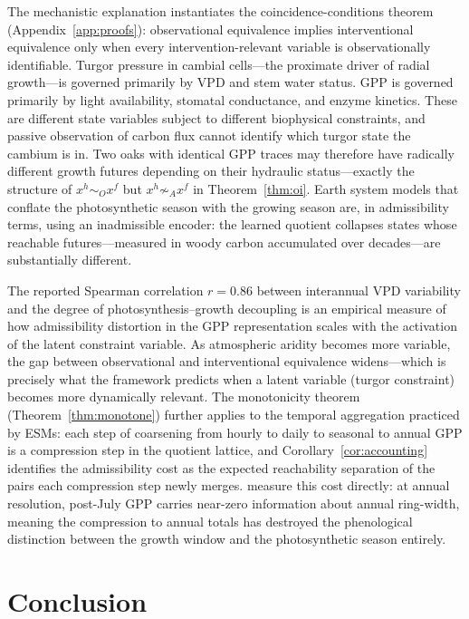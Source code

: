 \documentclass[10pt,twocolumn]{article}
\theoremstyle{plain}
\theoremstyle{definition}
\theoremstyle{remark}
\newcommand{\simA}{\sim_{\!A}}
\newcommand{\simO}{\sim_{\!O}}
\begin{document}
The mechanistic explanation instantiates the coincidence-conditions theorem
(Appendix~\ref{app:proofs}): observational equivalence implies interventional
equivalence only when every intervention-relevant variable is observationally
identifiable. Turgor pressure in cambial cells---the proximate driver of
radial growth---is governed primarily by VPD and stem water status. GPP is
governed primarily by light availability, stomatal conductance, and enzyme
kinetics. These are different state variables subject to different biophysical
constraints, and passive observation of carbon flux cannot identify which
turgor state the cambium is in. Two oaks with identical GPP traces may
therefore have radically different growth futures depending on their hydraulic
status---exactly the structure of $x^h \simO x^f$ but $x^h \not\simA x^f$
in Theorem~\ref{thm:oi}. Earth system models that conflate the photosynthetic
season with the growing season are, in admissibility terms, using an
inadmissible encoder: the learned quotient collapses states whose reachable
futures---measured in woody carbon accumulated over decades---are substantially
different.

The reported Spearman correlation $r = 0.86$ between interannual VPD
variability and the degree of photosynthesis--growth decoupling
\citep{rao2026decoupled} is an empirical measure of how admissibility
distortion in the GPP representation scales with the activation of the
latent constraint variable. As atmospheric aridity becomes more variable,
the gap between observational and interventional equivalence widens---which
is precisely what the framework predicts when a latent variable (turgor
constraint) becomes more dynamically relevant. The monotonicity theorem
(Theorem~\ref{thm:monotone}) further applies to the temporal aggregation
practiced by ESMs: each step of coarsening from hourly to daily to seasonal
to annual GPP is a compression step in the quotient lattice, and
Corollary~\ref{cor:accounting} identifies the admissibility cost as the
expected reachability separation of the pairs each compression step newly
merges. \citeauthor{rao2026decoupled} measure this cost directly: at annual
resolution, post-July GPP carries near-zero information about annual
ring-width, meaning the compression to annual totals has destroyed the
phenological distinction between the growth window and the photosynthetic
season entirely.

\section{Conclusion}
\label{sec:conclusion}
\end{document}
